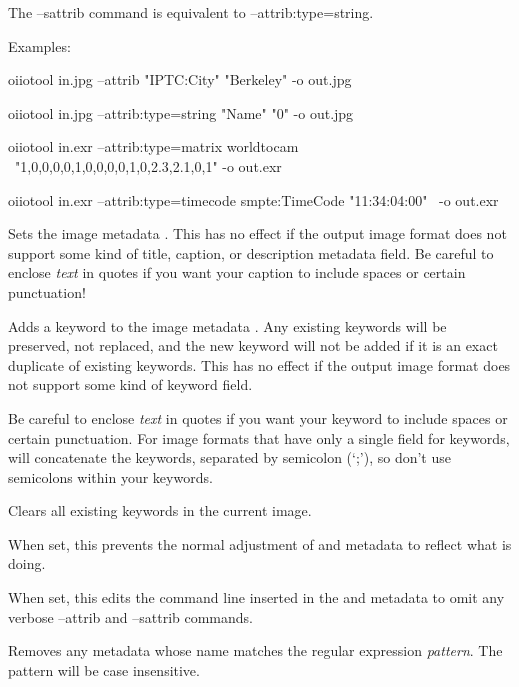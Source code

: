 \noindent The {\cf --sattrib} command is equivalent to {\cf --attrib:type=string}.

\noindent Examples:

\begin{code}
    oiiotool in.jpg --attrib "IPTC:City" "Berkeley" -o out.jpg

    oiiotool in.jpg --attrib:type=string "Name" "0" -o out.jpg

    oiiotool in.exr --attrib:type=matrix worldtocam \
            "1,0,0,0,0,1,0,0,0,0,1,0,2.3,2.1,0,1" -o out.exr

    oiiotool in.exr --attrib:type=timecode smpte:TimeCode "11:34:04:00" \
            -o out.exr
\end{code}
\apiend

Sets the image metadata .
This has no effect if the output image format does not support some kind
of title, caption, or description metadata field.
Be careful to enclose \emph{text} in quotes if you want your caption to
include spaces or certain punctuation!
\apiend

Adds a keyword to the image metadata .  Any existing
keywords will be preserved, not replaced, and the new keyword will not
be added if it is an exact duplicate of existing keywords.  This has no
effect if the output image format does not support some kind of keyword
field.  

Be careful to enclose \emph{text} in quotes if you want your keyword to
include spaces or certain punctuation.  For image formats that have only
a single field for keywords, \OpenImageIO will concatenate the keywords,
separated by semicolon (`;'), so don't use semicolons within your
keywords.
\apiend

Clears all existing keywords in the current image.
\apiend

When set, this prevents the normal adjustment of  and
\qkw{ImageHistory} metadata to reflect what \oiiotool is doing.
\apiend

When set, this edits the command line inserted in the  and
\qkw{ImageHistory} metadata to omit any verbose {\cf --attrib} and
{\cf --sattrib} commands.
\apiend

Removes any metadata whose name matches the regular expression \emph{pattern}.
The pattern will be case insensitive.

